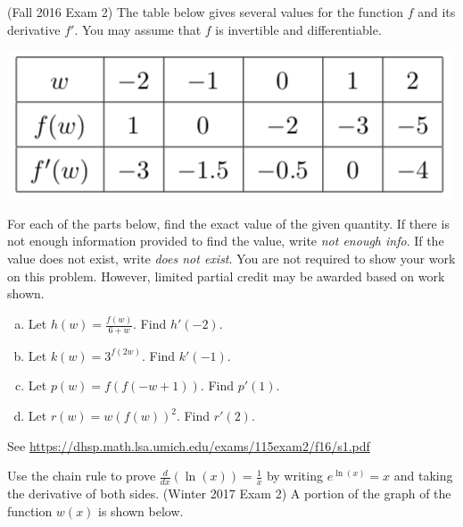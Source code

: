 \documentclass[11pt]{exam}
\begin{document}
\begin{questions}
\question (Fall 2016 Exam 2) %
The table below gives several values for the function $f$ and its derivative $f'$. You may assume that $f$ is invertible and differentiable.
\begin{center}
  \includegraphics[scale=0.4]{Figures/table2.png}
\end{center}
	For each of the parts below, find the exact value of the given quantity. If there is not enough information provided to find the value, write \emph{not enough info}. If the value does not exist, write \emph{does not exist}. You are not required to show your work on this problem. However, limited partial credit may be awarded based on work shown.
	\begin{multicols}{2}
	\begin{enumerate}[(a)]
	\item Let $h(w) = \frac{f(w)}{6+w}$. Find $h'(-2)$.
	\item Let $k(w) = 3^{f(2w)}$. Find $k'(-1)$.
	\item Let $p(w) = f(f(-w+1))$. Find $p'(1)$.
	\item Let $r(w) = w (f(w))^2$. Find $r'(2)$.
	\end{enumerate}
	\end{multicols}
        \begin{solution}
          See \href{https://dhsp.math.lsa.umich.edu/exams/115exam2/f16/s1.pdf}{https://dhsp.math.lsa.umich.edu/exams/115exam2/f16/s1.pdf}
        \end{solution}
\question Use the chain rule to prove \(\frac{d}{dx}(\ln(x)) =
  \frac{1}{x}\) by writing \(e^{\ln(x)} = x\) and taking the
  derivative of both sides.
\question (Winter 2017 Exam 2) %
  A portion of the graph of the function $w(x)$ is shown below.
  \begin{center}

\end{center}
\end{questions}
\end{document}
